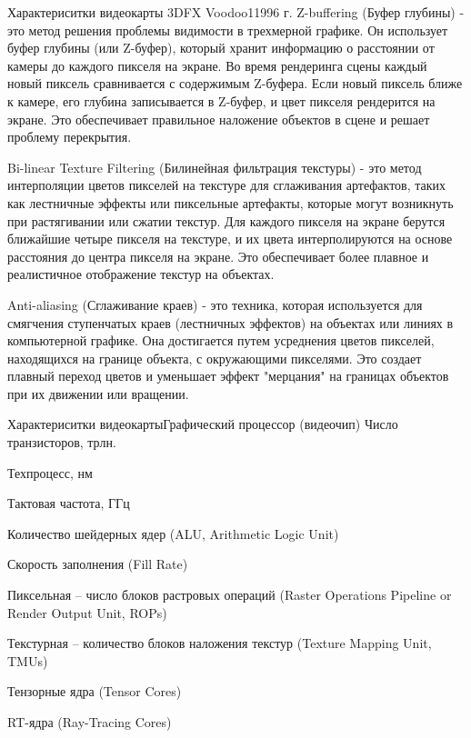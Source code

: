 \documentclass{beamer}
\begin{document}
\begin{frame}{Характериситки видеокарты 3DFX Voodoo1}{1996 г.}
	Z-buffering (Буфер глубины) 
	- это метод решения проблемы видимости в трехмерной графике. Он использует буфер глубины (или Z-буфер), который хранит информацию о расстоянии от камеры до каждого пикселя на экране. Во время рендеринга сцены каждый новый пиксель сравнивается с содержимым Z-буфера. Если новый пиксель ближе к камере, его глубина записывается в Z-буфер, и цвет пикселя рендерится на экране. Это обеспечивает правильное наложение объектов в сцене и решает проблему перекрытия.
	
	Bi-linear Texture Filtering (Билинейная фильтрация текстуры) 
	- это метод интерполяции цветов пикселей на текстуре для сглаживания артефактов, таких как лестничные эффекты или пиксельные артефакты, которые могут возникнуть при растягивании или сжатии текстур. Для каждого пикселя на экране берутся ближайшие четыре пикселя на текстуре, и их цвета интерполируются на основе расстояния до центра пикселя на экране. Это обеспечивает более плавное и реалистичное отображение текстур на объектах.
	
	Anti-aliasing (Сглаживание краев)
	- это техника, которая используется для смягчения ступенчатых краев (лестничных эффектов) на объектах или линиях в компьютерной графике. Она достигается путем усреднения цветов пикселей, находящихся на границе объекта, с окружающими пикселями. Это создает плавный переход цветов и уменьшает эффект "мерцания" на границах объектов при их движении или вращении.
	\fi
\end{frame}


\begin{frame}{Характериситки видеокарты}{Графический процессор (видеочип)}
	Число транзисторов, трлн.
	
	Техпроцесс, нм
	
	Тактовая частота, ГГц
	
	Количество шейдерных ядер (ALU, Arithmetic Logic Unit)
	
	Скорость заполнения (Fill Rate)
	
	Пиксельная – число блоков растровых операций (Raster Operations Pipeline
	or Render Output Unit, ROPs)
	
	Текстурная – количество блоков наложения текстур (Texture Mapping Unit,
	TMUs)
	
	Тензорные ядра (Tensor Cores)
	
	RT-ядра (Ray-Tracing Cores)
	
\end{frame}
\end{document}
